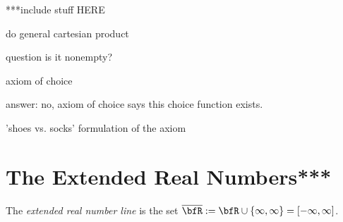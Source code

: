     \begin{center}
    \end{center}

    ***include stuff HERE 

    \begin{definition}
        
    \end{definition}


    do general cartesian product
    
    question is it nonempty?

    axiom of choice

    answer: no, axiom of choice says this choice function exists.

    'shoes vs. socks' formulation of the axiom

    \begin{center}
    \end{center}

\section{The Extended Real Numbers***}

\begin{definition}
    The \textit{extended real number line} is the set $\overline{\bfR} := \bfR \cup \{\infty,\infty\} = [-\infty,\infty]$.
\end{definition}

